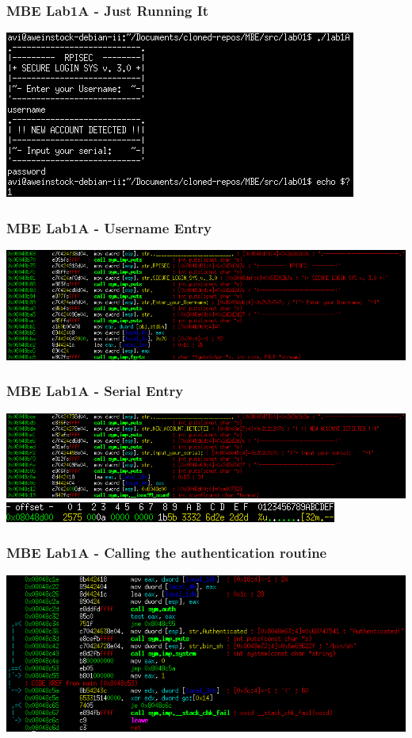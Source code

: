 \documentclass[aspectratio=169]{beamer}
\begin{document}
\begin{frame}[fragile]
\frametitle{MBE Lab1A - Just Running It}
\includegraphics[width=0.9\paperwidth]{pictures/mbe_lab1a_dynamic_fail_cropped.png}
\end{frame}

\begin{frame}[fragile]
\frametitle{MBE Lab1A - Username Entry}
\includegraphics[width=0.9\paperwidth]{pictures/intel/mbe_lab1a_username_entry.png}
\end{frame}

\begin{frame}[fragile]
\frametitle{MBE Lab1A - Serial Entry}
\includegraphics[width=0.9\paperwidth]{pictures/intel/mbe_lab1a_serial_entry.png}\\
\includegraphics[width=0.9\paperwidth]{pictures/mbe_lab1_scanf_arg_cropped.png}
\end{frame}

\begin{frame}[fragile]
\frametitle{MBE Lab1A - Calling the authentication routine}
\includegraphics[width=0.9\paperwidth]{pictures/intel/mbe_lab1a_call_auth.png}
\end{frame}
\end{document}
